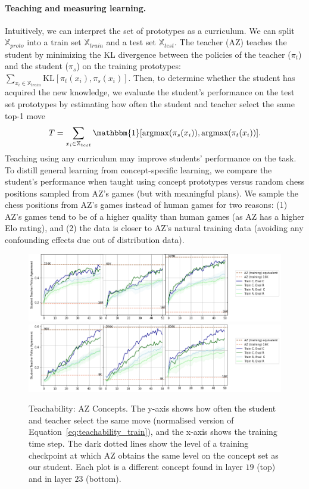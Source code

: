 \documentclass{article}
\def\Xset{\mathbb{X}}
\begin{document}
\paragraph{Teaching and measuring learning.}
Intuitively, we can interpret the set of prototypes as a curriculum. We can split $\Xset_{proto}$ into a train set $\Xset_{train}$ and a test set $\Xset_{test}$.
The teacher (AZ) teaches the student by 
minimizing the KL divergence between the policies of the teacher ($\pi_t$) and the student ($\pi_s$) on the training prototypes: $\sum_{x_i \in \Xset_{train}} \text{KL}[\pi_t(x_i), \pi_s(x_i)]$. 
Then, to determine whether the student has acquired the new knowledge, we evaluate the student's performance on the test set prototypes by estimating how often the student and teacher select the same top-1 move
\begin{equation} \label{eq:teachability_train}
   T =  \sum_{x_i \in \Xset_{test}} \mathbbm{1} [ \text{argmax}(\pi_s(x_i)), \text{argmax}(\pi_t(x_i)) ].
\end{equation}
Teaching using any curriculum may improve students' performance on the task. To distill general learning from concept-specific learning, we compare the student's performance when taught using concept prototypes versus random chess positions sampled from AZ's games (but with meaningful plans). We sample the chess positions from AZ's games instead of human games for two reasons: (1) AZ's games tend to be of a higher quality than human games (as AZ has a higher Elo rating), and (2) the data is closer to AZ's natural training data (avoiding any confounding effects due out of distribution data).  

\begin{figure}[h]
\caption{Teachability: AZ Concepts. The y-axis shows how often the student and teacher select the same move (normalised version of  Equation~\ref{eq:teachability_train}), and the x-axis shows the training time step. 
The dark dotted lines show the level of a training checkpoint at which AZ obtains the same level on the concept set as our student. Each plot is a different concept found in layer $19$ (top) and in layer $23$ (bottom).}
\label{fig:teachability}
\centering
\includegraphics[width=\textwidth]{images/retrain_layer19.png}
\includegraphics[width=\textwidth]{images/retrain_layer23.png}
\end{figure}
\end{document}
